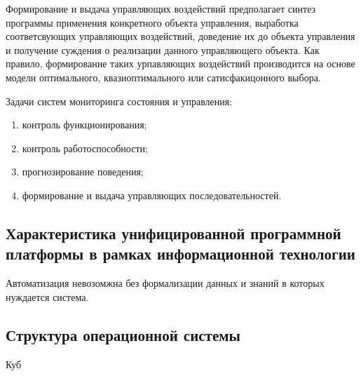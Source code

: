 \documentclass[a4paper,12pt]{report}
\begin{document}
	Формирование и выдача управляющих воздействий предполагает синтез программы
	применения конкретного объекта управления, выработка соответсвующих
	управляющих воздействий, доведение их до объекта управления и получение
	суждения о реализации данного управляющего объекта. Как правило, формирование
	таких урпавляющих воздействий производится на основе модели оптимального,
	квазиоптимального или сатисфакицонного выбора.

	Задачи систем мониторинга состояния и управления:
	\begin{enumerate}
		\item контроль функционирования;
		\item контроль работоспособности;
		\item прогнозирование поведения;
		\item формирование и выдача управляющих последовательностей.
	\end{enumerate}


\subsection{Характеристика унифицированной программной платформы в рамках
	информационной технологии}

	Автоматизация невозомжна без формализации данных и знаний в которых
	нуждается система.


\subsection{Структура операционной системы}

	Куб
\end{document}
